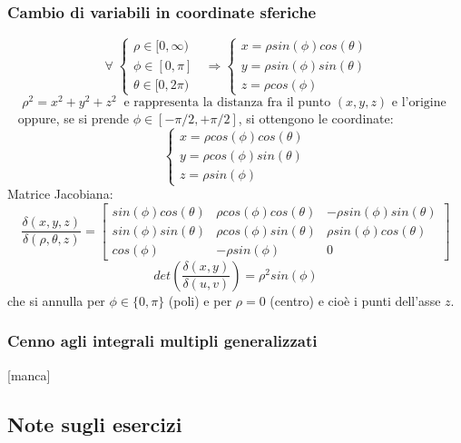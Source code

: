 \subsubsection{Cambio di variabili in coordinate sferiche}
\[
    \;\forall\; \begin{cases}
        \rho \in [0,\infty)\\
        \phi \in [0,\pi]\\
        \theta \in [0,2\pi)
    \end{cases} \;\; \Longrightarrow \begin{cases}
        x = \rho sin(\phi) cos(\theta)\\
        y = \rho sin(\phi) sin(\theta)\\
        z = \rho cos(\phi)
    \end{cases}
\]
\[
    \rho^2 = x^2 +y^2+z^2 \;\; \text{e rappresenta la distanza fra il punto $(x,y,z)$ e l'origine}\;
\]
\ \newline
oppure, se si prende $\phi \in [-\pi /2, + \pi/2]$, si ottengono le coordinate:
\[
    \begin{cases}
        x = \rho cos(\phi) cos(\theta)\\
        y = \rho cos(\phi) sin(\theta)\\
        z = \rho sin(\phi)
    \end{cases}
\]
Matrice Jacobiana:
\[
    \frac{\delta(x,y,z)}{\delta(\rho,\theta,z)} = \left[
        \begin{matrix}
            sin(\phi) cos(\theta) & \rho cos(\phi) cos(\theta) & -\rho sin(\phi) sin(\theta)\\ 
            sin(\phi) sin(\theta) & \rho cos(\phi) sin(\theta) & \rho sin(\phi) cos(\theta) \\ 
            cos(\phi) & -\rho sin(\phi) & 0
        \end{matrix}\right]
\]
\[
    det\left(\frac{\delta(x,y)}{\delta(u,v)}\right) = \rho^2 sin(\phi)
\]
che si annulla per $\phi \in \{0,\pi\}$ (poli) e per $\rho=0$ (centro) e cioè i punti dell'asse $z$.
\subsubsection{Cenno agli integrali multipli generalizzati}
[manca]
\subsection{Note sugli esercizi}
